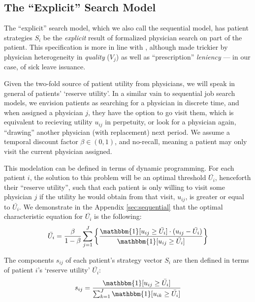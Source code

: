 \documentclass[../main.tex]{subfiles}
\begin{document}
\subsection{The ``Explicit'' Search Model}

The ``explicit'' search model, which we also call the sequential model, has patient strategies $S_i$ be the \textit{explicit} result of formalized physician search on part of the patient. This specification is more in line with \cite{schnell2017physician}, although made trickier by physician heterogeneity in \textit{quality} ($V_j$) as well as ``prescription'' \textit{leniency} — in our case, of sick leave issuance.

Given the two-fold source of patient utility from physicians, we will speak in general of patients' `reserve utility'. In a similar vain to sequential job search models, we envision patients as searching for a physician in discrete time, and when assigned a physician $j$, they have the option to go visit them, which is equivalent to recieving utility $u_{ij}$ in perpetuity, or look for a physician again, ``drawing'' another physician (with replacement) next period. We assume a temporal discount factor $\beta \in (0,1)$, and no-recall, meaning a patient may only visit the current physician assigned.

This modelation can be defined in terms of dynamic programming. For each patient $i$, the solution to this problem will be an optimal threshold $\bar{U_i}$, henceforth their ``reserve utility'', such that each patient is only willing to visit some physician $j$ if the utility he would obtain from that visit, $u_{ij}$, is greater or equal to $\bar{U_i}$. We demonstrate in the Appendix \ref{sec:sequential} that the optimal characteristic equation for $\bar{U_i}$ is the following:
\begin{equation}
    \bar{U_i} = \frac{\beta}{1-\beta}  \sum_{j=1}^{J} \left\{ \frac{\mathbbm{1}[ u_{ij} \geq \bar{U_i} ] \cdot (u_{ij} - \bar{U_i})}{\mathbbm{1}[ u_{ij} \geq \bar{U_i} ]} \right\}
    \label{eq:seq4}  
\end{equation}



The components $s_{ij}$ of each patient's strategy vector $S_i$ are then defined in terms of patient $i$'s `reserve utility' $\bar{U_i}$:
\begin{equation}
    s_{ij} = \frac{\mathbbm{1}[ u_{ij} \geq \bar{U_i} ]}
    {\sum_{k=1}^{J} \mathbbm{1}[ u_{ik} \geq \bar{U_i} ]}
    \label{eq:Schnell_s}  
\end{equation}
\end{document}
